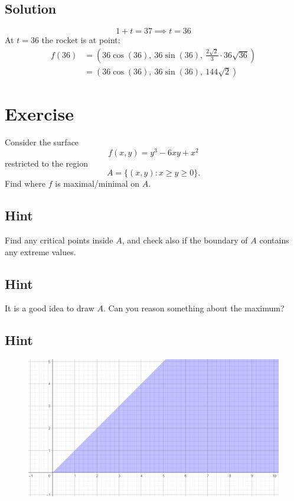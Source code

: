 \documentclass[a4paper,10pt]{article}
\begin{document}
\subsection{Solution}
\[
    1 + t = 37 \implies t = 36
\]
At $t=36$ the rocket is at point:
\begin{align*}
    f(36) & = \left(36\cos(36),\: 36\sin(36),\: \frac{2\sqrt{2}}{3}\cdot 36\sqrt{36}\right) \\
          & = \left(36\cos(36),\: 36\sin(36),\: 144\sqrt{2}\right)
\end{align*}

\clearpage

\section{Exercise}

Consider the surface
\[
    f(x,y) = y^3 - 6xy + x^2
\]
restricted to the region
\[
    A = \{(x,y): x \geq y \geq 0\}.
\]
Find where $f$ is maximal/minimal on $A$.

\subsection{Hint}
Find any critical points inside $A$, and check also if the boundary of $A$ contains any extreme values.

\subsection{Hint}
It is a good idea to draw $A$. Can you reason something about the maximum?

\subsection{Hint}

\begin{figure}[!ht]
    \centering
    \includegraphics[scale=0.5]{ex_10.png}
\end{figure}
\end{document}
